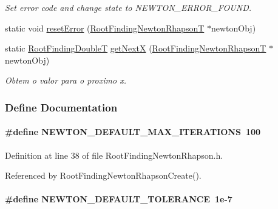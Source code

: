 \begin{CompactItemize}
\begin{CompactList}\small\item\em Set error code and change state to NEWTON\_\-ERROR\_\-FOUND. \item\end{CompactList}\item 
static void \hyperlink{group____newton_g3ebdf784fb05eaa2cc11fee2f1eef503}{resetError} (\hyperlink{structRootFindingNewtonRhapson}{RootFindingNewtonRhapsonT} $\ast$newtonObj)
\item 
static \hyperlink{RootFindingCommon_8h_a296fe63994e03408c4ad62794d472e9}{RootFindingDoubleT} \hyperlink{group____newton_gf3686b9647cf53686b267e45dc9ecd1e}{getNextX} (\hyperlink{structRootFindingNewtonRhapson}{RootFindingNewtonRhapsonT} $\ast$newtonObj)
\begin{CompactList}\small\item\em Obtem o valor para o proximo x. \item\end{CompactList}\end{CompactItemize}


\subsubsection{Define Documentation}
\hypertarget{group____newton_g4378a473f5c51c7d0e3ad25c0cea3791}{
\paragraph[NEWTON\_\-DEFAULT\_\-MAX\_\-ITERATIONS]{\setlength{\rightskip}{0pt plus 5cm}\#define NEWTON\_\-DEFAULT\_\-MAX\_\-ITERATIONS~100}\hfill}
\label{group____newton_g4378a473f5c51c7d0e3ad25c0cea3791}




Definition at line 38 of file RootFindingNewtonRhapson.h.

Referenced by RootFindingNewtonRhapsonCreate().\hypertarget{group____newton_gb4bcb10de94d9bd68c583377bd506975}{
\paragraph[NEWTON\_\-DEFAULT\_\-TOLERANCE]{\setlength{\rightskip}{0pt plus 5cm}\#define NEWTON\_\-DEFAULT\_\-TOLERANCE~1e-7}\hfill}
\label{group____newton_gb4bcb10de94d9bd68c583377bd506975}




